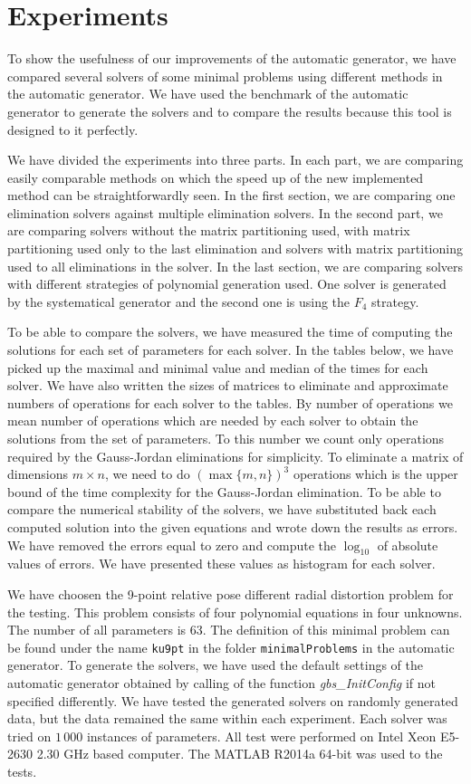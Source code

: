 \chapter{Experiments}
To show the usefulness of our improvements of the automatic generator, we have compared several solvers of some minimal problems using different methods in the automatic generator. We have used the benchmark of the automatic generator to generate the solvers and to compare the results because this tool is designed to it perfectly.

We have divided the experiments into three parts. In each part, we are comparing easily comparable methods on which the speed up of the new implemented method can be straightforwardly seen. In the first section, we are comparing one elimination solvers against multiple elimination solvers. In the second part, we are comparing solvers without the matrix partitioning used, with matrix partitioning used only to the last elimination and solvers with matrix partitioning used to all eliminations in the solver. In the last section, we are comparing solvers with different strategies of polynomial generation used. One solver is generated by the systematical generator and the second one is using the $F_4$ strategy.

To be able to compare the solvers, we have measured the time of computing the solutions for each set of parameters for each solver. In the tables below, we have picked up the maximal and minimal value and median of the times for each solver. We have also written the sizes of matrices to eliminate and approximate numbers of operations for each solver to the tables. By number of operations we mean number of operations which are needed by each solver to obtain the solutions from the set of parameters. To this number we count only operations required by the Gauss-Jordan eliminations for simplicity. To eliminate a matrix of dimensions $m \times n$, we need to do $(\max\{m, n\})^3$ operations which is the upper bound of the time complexity for the Gauss-Jordan elimination. To be able to compare the numerical stability of the solvers, we have substituted back each computed solution into the given equations and wrote down the results as errors. We have removed the errors equal to zero and compute the $\log_{10}$ of absolute values of errors. We have presented these values as histogram for each solver.

We have choosen the 9-point relative pose different radial distortion problem \cite{9pt} for the testing. This problem consists of four polynomial equations in four unknowns. The number of all parameters is 63. The definition of this minimal problem can be found under the name \texttt{ku9pt} in the folder \texttt{minimalProblems} in the automatic generator. To generate the solvers, we have used the default settings of the automatic generator obtained by calling of the function \textit{gbs\_InitConfig} if not specified differently. We have tested the generated solvers on randomly generated data, but the data remained the same within each experiment. Each solver was tried on $1\,000$ instances of parameters. All test were performed on Intel Xeon E5-2630 2.30 GHz based computer. The MATLAB R2014a 64-bit was used to the tests.

